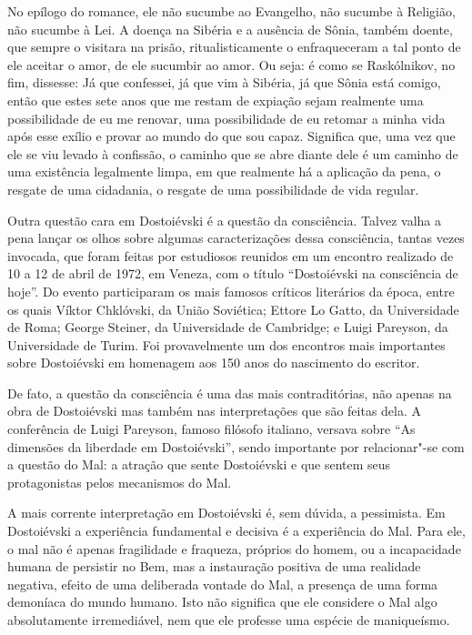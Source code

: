 No epílogo do romance, ele não sucumbe ao Evangelho, não sucumbe à
Religião, não sucumbe à Lei. A doença na Sibéria e a ausência de Sônia,
também doente, que sempre o visitara na prisão, ritualisticamente o
enfraqueceram a tal ponto de ele aceitar o amor, de ele sucumbir ao
amor. Ou seja: é como se Raskólnikov, no fim, dissesse: Já que
confessei, já que vim à Sibéria, já que Sônia está comigo, então que
estes sete anos que me restam de expiação sejam realmente uma
possibilidade de eu me renovar, uma possibilidade de eu retomar a minha
vida após esse exílio e provar ao mundo do que sou capaz. Significa que,
uma vez que ele se viu levado à confissão, o caminho que se abre diante
dele é um caminho de uma existência legalmente limpa, em que realmente
há a aplicação da pena, o resgate de uma cidadania, o resgate de uma
possibilidade de vida regular.

Outra questão cara em Dostoiévski é a questão da consciência. Talvez
valha a pena lançar os olhos sobre algumas caracterizações dessa
consciência, tantas vezes invocada, que foram feitas por estudiosos
reunidos em um encontro realizado de 10 a 12 de abril de 1972, em
Veneza, com o título ``Dostoiévski na consciência de hoje''. Do evento
participaram os mais famosos críticos literários da época, entre os
quais Víktor Chklóvski, da União Soviética; Ettore Lo Gatto, da
Universidade de Roma; George Steiner, da Universidade de Cambridge; e
Luigi Pareyson, da Universidade de Turim. Foi provavelmente um dos
encontros mais importantes sobre Dostoiévski em homenagem aos 150 anos
do nascimento do escritor.

De fato, a questão da consciência é uma das mais contraditórias, não
apenas na obra de Dostoiévski mas também nas interpretações que são
feitas dela. A conferência de Luigi Pareyson, famoso filósofo italiano,
versava sobre ``As dimensões da liberdade em Dostoiévski'', sendo
importante por relacionar"-se com a questão do Mal: a atração que sente
Dostoiévski e que sentem seus protagonistas pelos mecanismos do Mal.

A mais corrente interpretação em Dostoiévski é, sem dúvida, a
pessimista. Em Dostoiévski a experiência fundamental e decisiva é a
experiência do Mal. Para ele, o mal não é apenas fragilidade e fraqueza,
próprios do homem, ou a incapacidade humana de persistir no Bem, mas a
instauração positiva de uma realidade negativa, efeito de uma deliberada
vontade do Mal, a presença de uma forma demoníaca do mundo humano. Isto
não significa que ele considere o Mal algo absolutamente irremediável,
nem que ele professe uma espécie de maniqueísmo.


